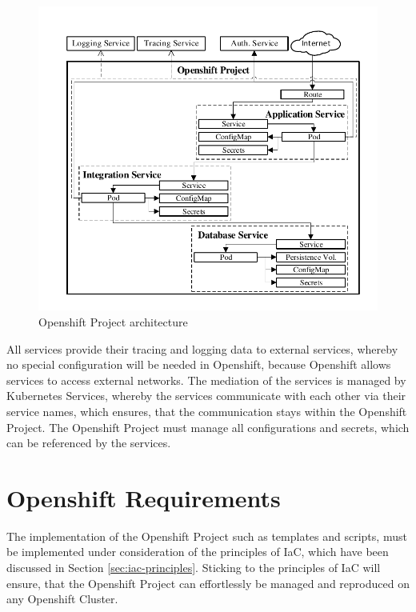 \begin{figure}[htbp]
	\centering
	\includegraphics[scale=1]{images/esboc-design-openshift.pdf}
	\caption{Openshift Project architecture}
	\label{fig:esboc-design-openshift-project}
\end{figure} 

All services provide their tracing and logging data to external services, whereby no special configuration will be needed in Openshift, because Openshift allows services to access external networks. The mediation of the services is managed by Kubernetes Services, whereby the services communicate with each other via their service names, which ensures, that the communication stays within the Openshift Project. The Openshift Project must manage all configurations and secrets, which can be referenced by the services.

\section{Openshift Requirements}
\label{sec:esboc-requirements-oc}
The implementation of the Openshift Project such as templates and scripts, must be implemented under consideration of the principles of IaC, which have been discussed in Section \vref{sec:iac-principles}. Sticking to the principles of IaC will ensure, that the Openshift Project can effortlessly be managed and reproduced on any Openshift Cluster. \\


